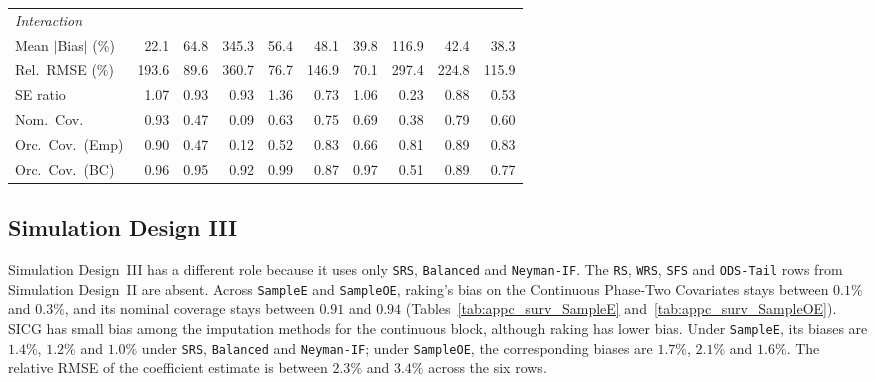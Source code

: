 \begin{table}[!htbp]
{\begin{tabular}{lrrrrrrrrr}
\midrule
\multicolumn{10}{l}{\textit{Interaction}} \\[2pt]
\quad Mean $|$Bias$|$ (\%) & \cellcolor{rankone}22.1 & 64.8 & 345.3 & 56.4 & 48.1 & \cellcolor{rankthree}39.8 & 116.9 & 42.4 & \cellcolor{ranktwo}38.3 \\
\quad Rel.\ RMSE (\%) & 193.6 & \cellcolor{rankthree}89.6 & 360.7 & \cellcolor{ranktwo}76.7 & 146.9 & \cellcolor{rankone}70.1 & 297.4 & 224.8 & 115.9 \\
\quad SE ratio & \cellcolor{ranktwo}1.07 & \cellcolor{ranktwo}0.93 & \cellcolor{ranktwo}0.93 & 1.36 & 0.73 & \cellcolor{rankone}1.06 & 0.23 & \cellcolor{rankthree}0.88 & 0.53 \\
\quad Nom.\ Cov. & \cellcolor{rankone}0.93 & 0.47 & 0.09 & 0.63 & \cellcolor{rankthree}0.75 & 0.69 & 0.38 & \cellcolor{ranktwo}0.79 & 0.60 \\
\quad Orc.\ Cov.\ (Emp) & \cellcolor{rankone}0.90 & 0.47 & 0.12 & 0.52 & \cellcolor{rankthree}0.83 & 0.66 & 0.81 & \cellcolor{ranktwo}0.89 & \cellcolor{rankthree}0.83 \\
\quad Orc.\ Cov.\ (BC) & \cellcolor{ranktwo}0.96 & \cellcolor{rankone}0.95 & 0.92 & 0.99 & 0.87 & \cellcolor{rankthree}0.97 & 0.51 & 0.89 & 0.77 \\
\bottomrule
\end{tabular}}
\end{table}

\subsection{Simulation Design III}
\label{sec:sicg_sim_surv}

Simulation Design~III has a different role because it uses only \texttt{SRS}, \texttt{Balanced} and \texttt{Neyman-IF}. The \texttt{RS}, \texttt{WRS}, \texttt{SFS} and \texttt{ODS-Tail} rows from Simulation Design~II are absent. Across \texttt{SampleE} and \texttt{SampleOE}, raking's bias on the Continuous Phase-Two Covariates stays between $0.1\%$ and $0.3\%$, and its nominal coverage stays between $0.91$ and $0.94$ (Tables~\ref{tab:appc_surv_SampleE} and~\ref{tab:appc_surv_SampleOE}). SICG has small bias among the imputation methods for the continuous block, although raking has lower bias. Under \texttt{SampleE}, its biases are $1.4\%$, $1.2\%$ and $1.0\%$ under \texttt{SRS}, \texttt{Balanced} and \texttt{Neyman-IF}; under \texttt{SampleOE}, the corresponding biases are $1.7\%$, $2.1\%$ and $1.6\%$. The relative RMSE of the coefficient estimate is between $2.3\%$ and $3.4\%$ across the six rows.

